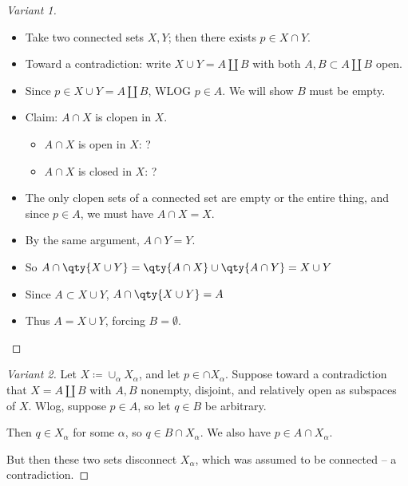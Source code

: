 
\begin{solution}

\envlist

\begin{proof}[Variant 1]

\begin{itemize}
\tightlist
\item
  Take two connected sets \(X, Y\); then there exists \(p\in X\cap Y\).
\item
  Toward a contradiction: write \(X\cup Y = A {\textstyle\coprod}B\)
  with both \(A, B \subset A{\textstyle\coprod}B\) open.
\item
  Since \(p\in X \cup Y = A{\textstyle\coprod}B\), WLOG \(p\in A\). We
  will show \(B\) must be empty.
\item
  Claim: \(A\cap X\) is clopen in \(X\).

  \begin{itemize}
  \tightlist
  \item
    \(A\cap X\) is open in \(X\): ?
  \item
    \(A\cap X\) is closed in \(X\): ?
  \end{itemize}
\item
  The only clopen sets of a connected set are empty or the entire thing,
  and since \(p\in A\), we must have \(A\cap X = X\).
\item
  By the same argument, \(A\cap Y = Y\).
\item
  So \(A\cap\qty{X\cup Y} = \qty{A\cap X} \cup\qty{A\cap Y} = X\cup Y\)
\item
  Since \(A\subset X\cup Y\), \(A\cap\qty{X\cup Y} = A\)
\item
  Thus \(A = X\cup Y\), forcing \(B = \emptyset\).
\end{itemize}

\end{proof}

\begin{proof}[Variant 2]

Let \(X \coloneqq\cup_\alpha X_\alpha\), and let \(p\in \cap X_\alpha\).
Suppose toward a contradiction that \(X = A {\textstyle\coprod}B\) with
\(A,B\) nonempty, disjoint, and relatively open as subspaces of \(X\).
Wlog, suppose \(p\in A\), so let \(q\in B\) be arbitrary.

Then \(q\in X_\alpha\) for some \(\alpha\), so \(q\in B \cap X_\alpha\).
We also have \(p\in A \cap X_\alpha\).

But then these two sets disconnect \(X_\alpha\), which was assumed to be
connected -- a contradiction.

\end{proof}

\end{solution}

